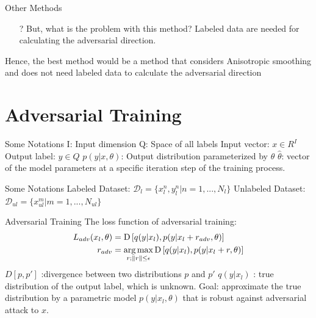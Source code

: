 \begin{frame}{Other Methods}
\begin{enumerate}
  \item[?] But, what is the problem with this method?
  \newline
  \newline
Labeled data are needed for calculating the adversarial direction.
\end{enumerate}
\pause
\vspace{2em}
Hence, the best method would be a method that considers Anisotropic smoothing and does not need labeled data to calculate the adversarial direction
\end{frame}

\section{Adversarial Training}
\begin{frame}{Some Notations}
I: Input dimension   \hfill  Q: Space of all labels
\newline
\newline
Input vector: $x\in R^{I}$ \hfill Output label: $y\in Q$
\newline
\newline
$p(y|x,\theta)$: Output distribution parameterized by $\theta$
\newline
\newline
$\hat{\theta}$: vector of the model parameters at a specific iteration step of the training process. 
\end{frame}

\begin{frame}{Some Notations}
Labeled Dataset: 
$\mathcal{D}_l = \{x_{l}^{n},y_{l}^{n}| n = 1,...,N_l\}$
\newline
\newline
Unlabeled Dataset:
$\mathcal{D}_{ul} = \{x_{ul}^{m}| m = 1,...,N_{ul}\}$
\end{frame}


\begin{frame}{Adversarial Training}
The loss function of adversarial training:
\\
\begin{align*}
L_{adv}(x_l, \theta) &= \operatorname*{D} \left[q(y | x_l), p(y | x_l + r_{adv}, \theta)\right]\\
r_{adv} &= \operatorname*{arg\,max}_{r; \left\lVert r\right\rVert \le \epsilon} \operatorname*{D} \left[q(y | x_l), p(y | x_l + r, \theta)\right]
\end{align*}
$D[p,p']$ :divergence between two distributions \(p\) and \(p'\)
\newline
$q(y|x_l)$ : true distribution of the output label, which is unknown.
\newline
\newline
Goal: approximate the true distribution by a parametric model $p(y|x_l,\theta)$ that is robust against adversarial attack to \(x\).
\end{frame}

